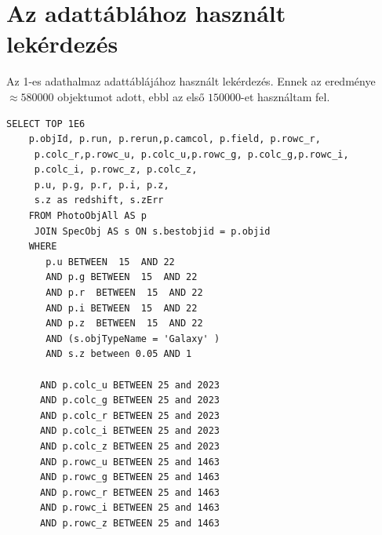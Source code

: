 \documentclass[12pt,letterpaper,oneside,openright]{book}
\begin{document}
\section{Az adattáblához használt lekérdezés}
\label{query}
Az 1-es adathalmaz adattáblájához használt lekérdezés. Ennek az eredménye $\approx \num{580000}$ objektumot adott, ebbl az első $\num{150000}$-et használtam fel.
\begin{verbatim}
SELECT TOP 1E6
    p.objId, p.run, p.rerun,p.camcol, p.field, p.rowc_r,
     p.colc_r,p.rowc_u, p.colc_u,p.rowc_g, p.colc_g,p.rowc_i, 
     p.colc_i, p.rowc_z, p.colc_z,
     p.u, p.g, p.r, p.i, p.z,
     s.z as redshift, s.zErr
    FROM PhotoObjAll AS p
     JOIN SpecObj AS s ON s.bestobjid = p.objid
    WHERE
       p.u BETWEEN  15  AND 22
       AND p.g BETWEEN  15  AND 22
       AND p.r  BETWEEN  15  AND 22
       AND p.i BETWEEN  15  AND 22
       AND p.z  BETWEEN  15  AND 22
       AND (s.objTypeName = 'Galaxy' )
       AND s.z between 0.05 AND 1
     
      AND p.colc_u BETWEEN 25 and 2023
      AND p.colc_g BETWEEN 25 and 2023
      AND p.colc_r BETWEEN 25 and 2023
      AND p.colc_i BETWEEN 25 and 2023
      AND p.colc_z BETWEEN 25 and 2023
      AND p.rowc_u BETWEEN 25 and 1463
      AND p.rowc_g BETWEEN 25 and 1463
      AND p.rowc_r BETWEEN 25 and 1463
      AND p.rowc_i BETWEEN 25 and 1463
      AND p.rowc_z BETWEEN 25 and 1463
\end{verbatim}
\end{document}
